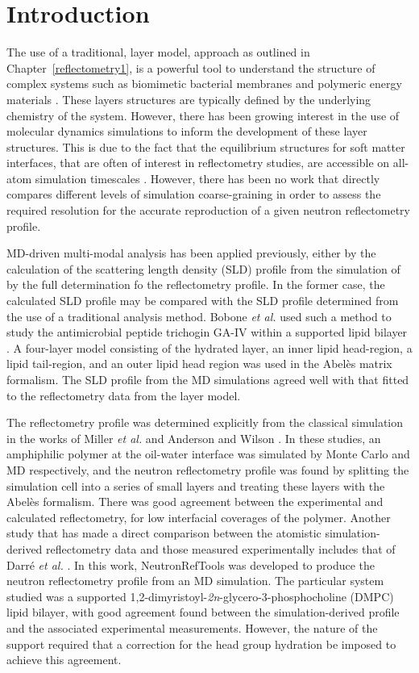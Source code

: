 \section{Introduction}
The use of a traditional, layer model, approach as outlined in Chapter~\ref{reflectometry1}, is a powerful tool to understand the structure of complex systems such as biomimetic bacterial membranes \cite{barker_neutron_2016} and polymeric energy materials \cite{khodakarimi_x-ray_2016}.
These layers structures are typically defined by the underlying chemistry of the system.
However, there has been growing interest in the use of molecular dynamics simulations to inform the development of these layer structures.
This is due to the fact that the equilibrium structures for soft matter interfaces, that are often of interest in reflectometry studies, are accessible on all-atom simulation timescales \cite{scoppola_combining_2018}.
However, there has been no work that directly compares different levels of simulation coarse-graining in order to assess the required resolution for the accurate reproduction of a given neutron reflectometry profile.

MD-driven multi-modal analysis has been applied previously, either by the calculation of the scattering length density (SLD) profile from the simulation of by the full determination fo the reflectometry profile.
In the former case, the calculated SLD profile may be compared with the SLD profile determined from the use of a traditional analysis method.
Bobone \emph{et al.} used such a method to study the antimicrobial peptide trichogin GA-IV within a supported lipid bilayer \cite{bobone_membrane_2013}.
A four-layer model consisting of the hydrated  layer, an inner lipid head-region, a lipid tail-region, and an outer lipid head region was used in the Abel\`{e}s matrix formalism.
The SLD profile from the MD simulations agreed well with that fitted to the reflectometry data from the layer model.

The reflectometry profile was determined explicitly from the classical simulation in the works of Miller \emph{et al.} and Anderson and Wilson \cite{miller_monte_2003,anderson_molecular_2004}.
In these studies, an amphiphilic polymer at the oil-water interface was simulated by Monte Carlo and MD respectively, and the neutron reflectometry profile was found by splitting the simulation cell into a series of small layers and treating these layers with the Abel\`{e}s formalism.
There was good agreement between the experimental and calculated reflectometry, for low interfacial coverages of the polymer.
Another study that has made a direct comparison between the atomistic simulation-derived reflectometry data and those measured experimentally includes that of Darr\'{e} \emph{et al.} \cite{darre_molecular_2015}.
In this work, NeutronRefTools was developed to produce the neutron reflectometry profile from an MD simulation.
The particular system studied was a supported 1,2-dimyristoyl-\emph{2n}-glycero-3-phosphocholine (DMPC) lipid bilayer, with good agreement found between the simulation-derived profile and the associated experimental measurements.
However, the nature of the support required that a correction for the head group hydration be imposed to achieve this agreement.

